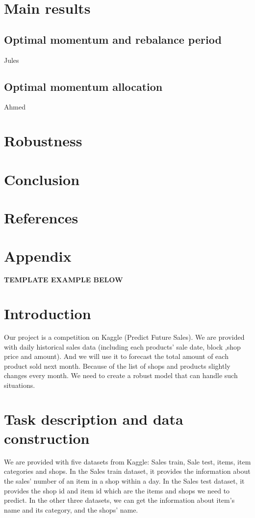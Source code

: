 \documentclass{article}
\begin{document}
\section{Main results}
\subsection{Optimal momentum and rebalance period}
Jules
\subsection{Optimal momentum allocation}
Ahmed
\section{Robustness}

\section{Conclusion}
\section{References}
\section{Appendix}
\textbf{TEMPLATE EXAMPLE BELOW}
\section{Introduction}
Our project is a competition on Kaggle (Predict Future Sales). We are provided with daily historical sales data (including each products’ sale date, block ,shop price and amount). And we will use it to forecast the total amount of each product sold next month. Because of the list of shops and products slightly changes every month. We need to create a robust model that can handle such situations.


\section{Task description and data construction}
\label{sec:headings}
We are provided with five datasets from Kaggle: Sales train, Sale test, items, item categories and shops. In the Sales train dataset, it provides the information about the sales’ number of an item in a shop within a day. In the Sales test dataset, it provides the shop id and item id which are the items and shops we need to predict. In the other three datasets, we can get the information about item’s name and its category, and the shops’ name.
\end{document}
